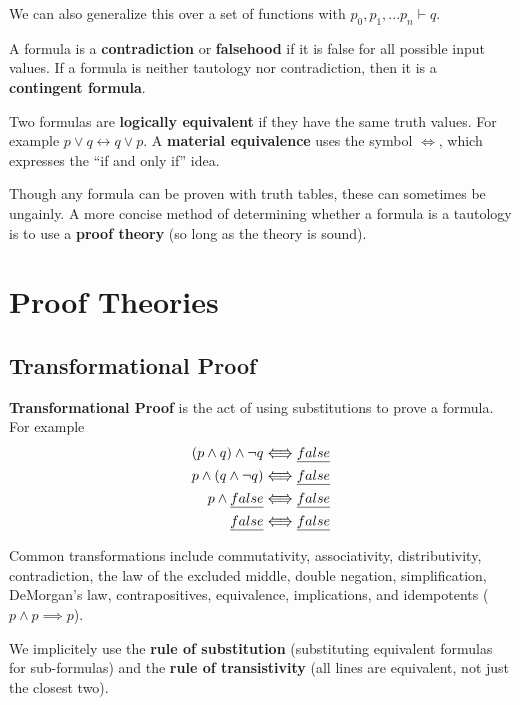 \documentclass[12pt]{article}
\newcommand{\trans}{\ensuremath{\Lleftarrow\!\Rrightarrow}}
\begin{document}
We can also generalize this over a set of functions with $p_0, p_1, ... p_n \vdash q$.

A formula is a {\bf contradiction} or {\bf falsehood} if it is false for all possible input values. If a formula is neither tautology nor contradiction, then it is a {\bf contingent formula}.

Two formulas are {\bf logically equivalent} if they have the same truth values. For example $p \lor q \leftrightarrow q \lor p$. A {\bf material equivalence} uses the symbol $\Leftrightarrow$, which expresses the ``if and only if'' idea.

Though any formula can be proven with truth tables, these can sometimes be ungainly. A more concise method of determining whether a formula is a tautology is to use a {\bf proof theory} (so long as the theory is sound).

\section*{Proof Theories}
\subsection*{Transformational Proof}
{\bf Transformational Proof} is the act of using substitutions to prove a formula. For example
\begin{align*}
(p \land q) \land \neg q &\trans \emph{false}\\
p \land (q \land \neg q) &\trans \emph{false}\\
p \land \emph{false} &\trans \emph{false}\\
\emph{false} &\trans \emph{false}
\end{align*}

Common transformations include commutativity, associativity, distributivity, contradiction, the law of the excluded middle, double negation, simplification, DeMorgan's law, contrapositives, equivalence, implications, and idempotents ($p \land p \implies p$).

We implicitely use the {\bf rule of substitution} (substituting equivalent formulas for sub-formulas) and the {\bf rule of transistivity} (all lines are equivalent, not just the closest two).
\end{document}

